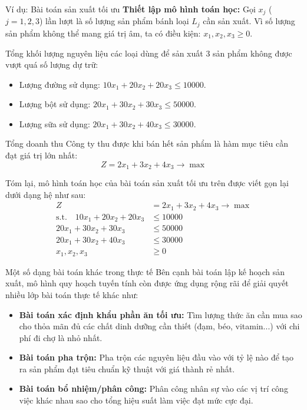 \begin{exampleblock}{Ví dụ: Bài toán sản xuất tối ưu}
\textbf{Thiết lập mô hình toán học:}
Gọi $x_j$ ($j = 1, 2, 3$) lần lượt là số lượng sản phẩm bánh loại $L_j$ cần sản xuất. 
Vì số lượng sản phẩm không thể mang giá trị âm, ta có điều kiện: $x_1, x_2, x_3 \ge 0$.

Tổng khối lượng nguyên liệu các loại dùng để sản xuất 3 sản phẩm không được vượt quá số lượng dự trữ:
\begin{itemize}
    \item Lượng đường sử dụng: $10x_1 + 20x_2 + 20x_3 \le 10000$.
    \item Lượng bột sử dụng: $20x_1 + 30x_2 + 30x_3 \le 50000$.
    \item Lượng sữa sử dụng: $20x_1 + 30x_2 + 40x_3 \le 30000$.
\end{itemize}

Tổng doanh thu Công ty thu được khi bán hết sản phẩm là hàm mục tiêu cần đạt giá trị lớn nhất:
\begin{equation*}
    Z = 2x_1 + 3x_2 + 4x_3 \rightarrow \max
\end{equation*}

Tóm lại, mô hình toán học của bài toán sản xuất tối ưu trên được viết gọn lại dưới dạng hệ như sau:
\[
\begin{aligned}
    Z &= 2x_1 + 3x_2 + 4x_3 \rightarrow \max \\
    \text{s.t.} \quad 10x_1 + 20x_2 + 20x_3 &\le 10000 \\
    20x_1 + 30x_2 + 30x_3 &\le 50000 \\
    20x_1 + 30x_2 + 40x_3 &\le 30000 \\
    x_1, x_2, x_3 &\ge 0
\end{aligned}
\]

\end{exampleblock}

\begin{remarkblock}{Một số dạng bài toán khác trong thực tế}
Bên cạnh bài toán lập kế hoạch sản xuất, mô hình quy hoạch tuyến tính còn được ứng dụng rộng rãi để giải quyết nhiều lớp bài toán thực tế khác như:
\begin{itemize}
    \item \textbf{Bài toán xác định khẩu phần ăn tối ưu:} Tìm lượng thức ăn cần mua sao cho thỏa mãn đủ các chất dinh dưỡng cần thiết (đạm, béo, vitamin...) với chi phí đi chợ là nhỏ nhất.
    \item \textbf{Bài toán pha trộn:} Pha trộn các nguyên liệu đầu vào với tỷ lệ nào để tạo ra sản phẩm đạt tiêu chuẩn kỹ thuật với giá thành rẻ nhất.
    \item \textbf{Bài toán bổ nhiệm/phân công:} Phân công nhân sự vào các vị trí công việc khác nhau sao cho tổng hiệu suất làm việc đạt mức cực đại.
\end{itemize}
\end{remarkblock}


